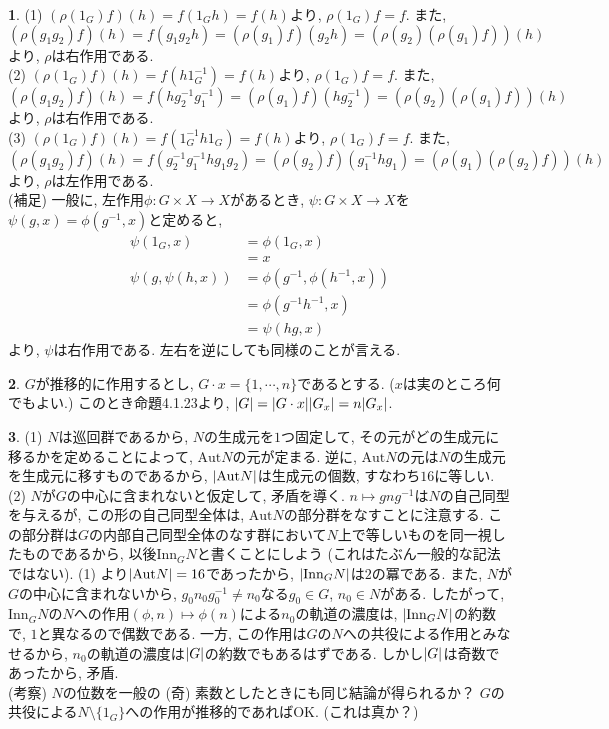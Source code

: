 \documentclass{amsart}
\theoremstyle{definition}
\newtheorem{ans}{}
\numberwithin{ans}{subsection}
\DeclarePairedDelimiter{\abs}{\lvert}{\rvert}
\begin{document}
\begin{ans}
  (1) $(\rho(1_G)f)(h) = f(1_Gh) = f(h)$より, $\rho(1_G)f = f$.
  また, $(\rho(g_1g_2)f)(h) = f(g_1g_2h) = (\rho(g_1)f)(g_2h) = (\rho(g_2)(\rho(g_1)f))(h)$
  より, $\rho$は右作用である.\\
  (2) $(\rho(1_G)f)(h) = f(h1_G^{-1}) = f(h)$より, $\rho(1_G)f = f$.
  また, $(\rho(g_1g_2)f)(h) = f(hg_2^{-1}g_1^{-1}) = (\rho(g_1)f)(hg_2^{-1}) = (\rho(g_2)(\rho(g_1)f))(h)$
  より, $\rho$は右作用である.\\
  (3) $(\rho(1_G)f)(h) = f(1_G^{-1}h1_G) = f(h)$より, $\rho(1_G)f = f$.
  また, $(\rho(g_1g_2)f)(h) = f(g_2^{-1}g_1^{-1}hg_1g_2) = (\rho(g_2)f)(g_1^{-1}hg_1) = (\rho(g_1)(\rho(g_2)f))(h)$
  より, $\rho$は左作用である.\\
  (補足) 一般に, 左作用$\phi: G \times X \rightarrow X$があるとき,
  $\psi: G \times X \rightarrow X$を$\psi(g, x) = \phi(g^{-1}, x)$と定めると,
  \begin{align*}
    \psi(1_G, x) &= \phi(1_G, x) \\
    &= x \\
    \psi(g, \psi(h, x)) &= \phi(g^{-1}, \phi(h^{-1}, x)) \\
    &= \phi(g^{-1}h^{-1}, x) \\
    &= \psi(hg, x)
  \end{align*}
  より, $\psi$は右作用である. 左右を逆にしても同様のことが言える.
\end{ans}

\begin{ans}
  $G$が推移的に作用するとし, $G \cdot x = \{1, \cdots , n\}$であるとする. ($x$は実のところ何でもよい.)
  このとき命題4.1.23より, $\abs{G} = \abs{G \cdot x}\abs{G_x} = n\abs{G_x}$.
\end{ans}

\begin{ans}
  (1) $N$は巡回群であるから, $N$の生成元を$1$つ固定して,
  その元がどの生成元に移るかを定めることによって, $\mathrm{Aut}N$の元が定まる.
  逆に, $\mathrm{Aut}N$の元は$N$の生成元を生成元に移すものであるから, $\abs{\mathrm{Aut}N}$は生成元の個数, すなわち$16$に等しい.\\
  (2) $N$が$G$の中心に含まれないと仮定して, 矛盾を導く.
  $n \mapsto gng^{-1}$は$N$の自己同型を与えるが, この形の自己同型全体は, $\mathrm{Aut}N$の部分群をなすことに注意する.
  この部分群は$G$の内部自己同型全体のなす群において$N$上で等しいものを同一視したものであるから,
  以後$\mathrm{Inn}_GN$と書くことにしよう (これはたぶん一般的な記法ではない).
  (1) より$\abs{\mathrm{Aut}N} = 16$であったから, $\abs{\mathrm{Inn}_GN}$は$2$の冪である.
  また, $N$が$G$の中心に含まれないから, $g_0n_0g_0^{-1} \neq n_0$なる$g_0 \in G$, $n_0 \in N$がある.
  したがって, $\mathrm{Inn}_GN$の$N$への作用$(\phi, n) \mapsto \phi(n)$による$n_0$の軌道の濃度は,
  $\abs{\mathrm{Inn}_GN}$の約数で, $1$と異なるので偶数である.
  一方, この作用は$G$の$N$への共役による作用とみなせるから, $n_0$の軌道の濃度は$\abs{G}$の約数でもあるはずである.
  しかし$\abs{G}$は奇数であったから, 矛盾.\\
  (考察) $N$の位数を一般の (奇) 素数としたときにも同じ結論が得られるか？ $G$の共役による$N\setminus\{1_G\}$への作用が推移的であればOK. (これは真か？)
\end{ans}
\end{document}
